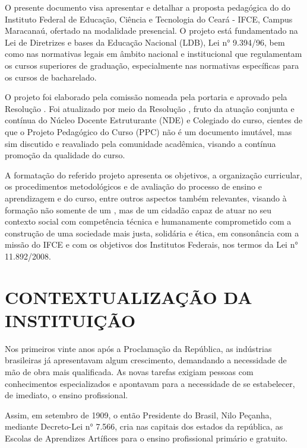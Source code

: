 \documentclass{paper}
\begin{document}
O presente documento visa apresentar e detalhar a proposta pedagógica do \NOMECURSO do Instituto Federal de Educação, Ciência e Tecnologia do Ceará - IFCE, Campus Maracanaú, ofertado na modalidade presencial. O projeto está fundamentado na Lei de Diretrizes e bases da Educação Nacional (LDB), Lei n° 9.394/96, bem como nas normativas legais em âmbito nacional e institucional que regulamentam os cursos superiores de graduação, especialmente nas normativas específicas para os cursos de bacharelado. 

O projeto foi elaborado pela comissão nomeada pela portaria \PORTARIACOMISSAO e aprovado pela Resolução \RESOLUCAOAPROVACAO. Foi atualizado por meio da Resolução \RESOLUCAOAPROVACAONOVA, fruto da atuação conjunta e contínua do Núcleo Docente Estruturante (NDE) e Colegiado do curso, cientes de que o Projeto Pedagógico do Curso (PPC) não é um documento imutável, mas sim discutido e reavaliado pela comunidade acadêmica, visando a contínua promoção da qualidade do curso. 

A formatação do referido projeto apresenta os objetivos, a organização curricular, os procedimentos metodológicos e de avaliação do processo de ensino e aprendizagem e do curso, entre outros aspectos também relevantes, visando à formação não somente de um \NOMEPROFISSIONAL, mas de um cidadão capaz de atuar no seu contexto social com competência técnica e humanamente comprometido com a construção de uma sociedade mais justa, solidária e ética, em consonância com a missão do IFCE e com os objetivos dos Institutos Federais, nos termos da Lei n° 11.892/2008.


\clearpage\section{CONTEXTUALIZAÇÃO DA INSTITUIÇÃO}
Nos primeiros vinte anos após a Proclamação da República, as indústrias brasileiras já apresentavam algum crescimento, demandando a necessidade de mão de obra mais qualificada. As novas tarefas exigiam pessoas com conhecimentos especializados e apontavam para a necessidade de se estabelecer, de imediato, o ensino profissional.

Assim, em setembro de 1909, o então Presidente do Brasil, Nilo Peçanha, mediante Decreto-Lei n° 7.566, cria nas capitais dos estados da república, as Escolas de Aprendizes Artífices para o ensino profissional primário e gratuito.
\end{document}
